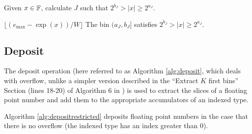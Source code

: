     \begin{samepage}
    \begin{alg}
      Given $x \in \mathbb{F}$, calculate $J$ such that $2^{b_J} > |x| \geq 2^{a_J}$.
      \begin{algorithmic}[1]
          \State \Return $\lfloor(e_{\max} - \exp(x))/W\rfloor$
        \EndFunction
        \Ensure
          \Statex The bin $(a_{J}, b_{J}]$ satisfies $2^{b_{J}} > |x| \geq 2^{a_{J}}$.
      \end{algorithmic}
      \label{alg:index}
    \end{alg}
     \end{samepage}

  \subsection{Deposit}
    \label{sec:primitiveops_deposit}
    The deposit operation (here referred to as Algorithm \ref{alg:deposit},
    which deals with overflow, unlike a simpler version described in the
    ``Extract $K$ first bins'' Section (lines 18-20) of Algorithm $6$ in
    \cite{repsum}) is used to extract the slices of a floating point number and
    add them to the appropriate accumulators of an indexed type.

    Algorithm \ref{alg:depositrestricted} deposits floating point numbers in
    the case that there is no overflow (the indexed type has an index greater
    than 0).

